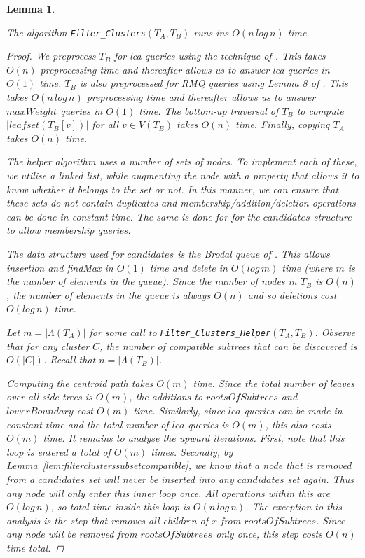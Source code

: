 \documentclass{article}
\newcommand{\leafset}{\Lambda}
\newtheorem{filterclustersruntime}[incompatibility]{Lemma}
\begin{document}
    \begin{filterclustersruntime}
        \label{lem:filterclustersruntime}

        The algorithm \texttt{Filter\_Clusters}$(T_A, T_B)$ runs ins $O(n\,log\,n)$ time.

        \begin{proof}
            We preprocess $T_B$ for \textit{lca} queries using the technique of \cite{bender2000lca}. This takes $O(n)$ preprocessing time and thereafter allows us to answer \textit{lca} queries in $O(1)$ time. $T_B$ is also preprocessed for RMQ queries using Lemma 8 of \cite{jansson2018algorithms}. This takes $O(n\,log\,n)$ preprocessing time and thereafter allows us to answer $maxWeight$ queries in $O(1)$ time. The bottom-up traversal of $T_B$ to compute $|leafset(T_B[v])|$ for all $v \in V(T_B)$ takes $O(n)$ time. Finally, copying $T_A$ takes $O(n)$ time.

            The helper algorithm uses a number of sets of nodes. To implement each of these, we utilise a linked list, while augmenting the node with a property that allows it to know whether it belongs to the set or not. In this manner, we can ensure that these sets do not contain duplicates and membership/addition/deletion operations can be done in constant time. The same is done for for the $candidates$ structure to allow membership queries.

            The data structure used for $candidates$ is the Brodal queue of \cite{brodal1995fast}. This allows insertion and findMax in $O(1)$ time and delete in $O(log\,m)$ time (where $m$ is the number of elements in the queue). Since the number of nodes in $T_B$ is $O(n)$, the number of elements in the queue is always $O(n)$ and so deletions cost $O(log\,n)$ time.

            Let $m = |\leafset(T_A)|$ for some call to \texttt{Filter\_Clusters\_Helper}$(T_A, T_B)$. Observe that for any cluster $C$, the number of compatible subtrees that can be discovered is $O(|C|)$. Recall that $n = |\leafset(T_B)|$.

            Computing the centroid path takes $O(m)$ time. Since the total number of leaves over all side trees is $O(m)$, the additions to $rootsOfSubtrees$ and $lowerBoundary$ cost $O(m)$ time. Similarly, since $lca$ queries can be made in constant time and the total number of $lca$ queries is $O(m)$, this also costs $O(m)$ time. It remains to analyse the upward iterations. First, note that this loop is entered a total of $O(m)$ times. Secondly, by Lemma~\ref{lem:filterclusterssubsetcompatible}, we know that a node that is removed from a $candidates$ set will never be inserted into any $candidates$ set again. Thus any node will only enter this inner loop once. All operations within this are $O(log\,n)$, so total time inside this loop is $O(n\,log\,n)$. The exception to this analysis is the step that removes all children of $x$ from $rootsOfSubtrees$. Since any node will be removed from $rootsOfSubtrees$ only once, this step costs $O(n)$ time total.


\end{proof}
\end{filterclustersruntime}
\end{document}
